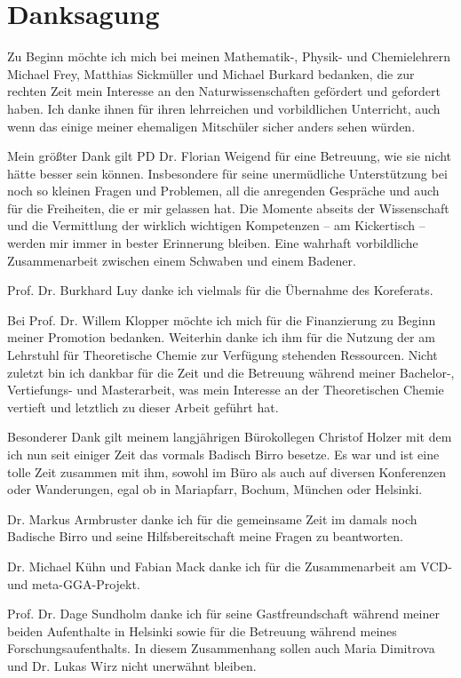 \chapter*{Danksagung}
Zu Beginn möchte ich mich bei meinen Mathematik-, Physik- und Chemielehrern Michael Frey, Matthias Sickmüller und Michael Burkard bedanken, die zur rechten Zeit mein Interesse an den Naturwissenschaften gefördert und gefordert haben. Ich danke ihnen für ihren lehrreichen und vorbildlichen Unterricht, auch wenn das einige meiner ehemaligen Mitschüler sicher anders sehen würden.

\bigskip
Mein größter Dank gilt PD Dr. Florian Weigend für eine Betreuung, wie sie nicht hätte besser sein können. Insbesondere für seine unermüdliche Unterstützung bei noch so kleinen Fragen und Problemen, all die anregenden Gespräche und auch für die Freiheiten, die er mir gelassen hat. Die Momente abseits der Wissenschaft und die Vermittlung der wirklich wichtigen Kompetenzen -- am Kickertisch -- werden mir immer in bester Erinnerung bleiben. Eine wahrhaft vorbildliche Zusammenarbeit zwischen einem Schwaben und einem Badener.

\bigskip
Prof. Dr. Burkhard Luy danke ich vielmals für die Übernahme des Koreferats.

\bigskip
Bei Prof. Dr. Willem Klopper möchte ich mich für die Finanzierung zu Beginn meiner Promotion bedanken. Weiterhin danke ich ihm für die Nutzung der am Lehrstuhl für Theoretische Chemie zur Verfügung stehenden Ressourcen. Nicht zuletzt bin ich dankbar für die Zeit und die Betreuung während meiner Bachelor-, Vertiefungs- und Masterarbeit, was mein Interesse an der Theoretischen Chemie vertieft und letztlich zu dieser Arbeit geführt hat.

\bigskip
Besonderer Dank gilt meinem langjährigen Bürokollegen Christof Holzer mit dem ich nun seit einiger Zeit das \glqq vormals Badisch Birro\grqq{} besetze. Es war und ist eine tolle Zeit zusammen mit ihm, sowohl im Büro als auch auf diversen Konferenzen oder Wanderungen, egal ob in Mariapfarr, Bochum, München oder Helsinki.

\bigskip
Dr. Markus Armbruster danke ich für die gemeinsame Zeit im damals noch \glqq Badische Birro\grqq{} und seine Hilfsbereitschaft meine Fragen zu beantworten. 

Dr. Michael Kühn und Fabian Mack danke ich für die Zusammenarbeit am VCD- und meta-GGA-Projekt.  

\bigskip
Prof. Dr. Dage Sundholm danke ich für seine Gastfreundschaft während meiner beiden Aufenthalte in Helsinki sowie für die Betreuung während meines Forschungsaufenthalts. In diesem Zusammenhang sollen auch Maria Dimitrova und Dr. Lukas Wirz nicht unerwähnt bleiben.


